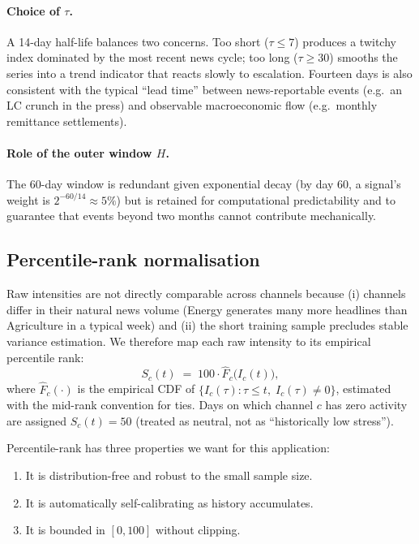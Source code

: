 \documentclass[11pt, a4paper]{article}
\begin{document}
\paragraph{Choice of $\tau$.} A 14-day half-life balances two concerns.
Too short ($\tau \le 7$) produces a twitchy index dominated by the most
recent news cycle; too long ($\tau \ge 30$) smooths the series into a
trend indicator that reacts slowly to escalation. Fourteen days is also
consistent with the typical ``lead time'' between news-reportable
events (e.g.\ an LC crunch in the press) and observable macroeconomic
flow (e.g.\ monthly remittance settlements).

\paragraph{Role of the outer window $H$.} The $60$-day window is
redundant given exponential decay (by day 60, a signal's weight is
$2^{-60/14} \approx 5\%$) but is retained for computational
predictability and to guarantee that events beyond two months cannot
contribute mechanically.

\subsection{Percentile-rank normalisation}

Raw intensities are not directly comparable across channels because
(i) channels differ in their natural news volume (Energy generates many
more headlines than Agriculture in a typical week) and (ii) the short
training sample precludes stable variance estimation. We therefore
map each raw intensity to its empirical percentile rank:
\begin{equation}
  S_c(t) \;=\; 100 \cdot \hat{F}_{c}\bigl(I_c(t)\bigr),
  \label{eq:percentile}
\end{equation}
where $\hat{F}_c(\cdot)$ is the empirical CDF of $\{I_c(\tau) : \tau \le
t,\; I_c(\tau) \neq 0\}$, estimated with the mid-rank convention for
ties. Days on which channel $c$ has zero activity are assigned
$S_c(t) = 50$ (treated as neutral, not as ``historically low stress'').

Percentile-rank has three properties we want for this application:
\begin{enumerate}[leftmargin=2em, topsep=0.2em, itemsep=0.2em]
  \item It is distribution-free and robust to the small sample size.
  \item It is automatically self-calibrating as history accumulates.
  \item It is bounded in $[0, 100]$ without clipping.
\end{enumerate}
\end{document}
